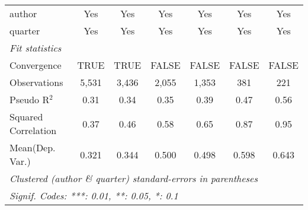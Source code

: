 \begin{tabular}{lcccccc}
   author                                                     & Yes           & Yes           & Yes           & Yes           & Yes           & Yes\\  
   quarter                                                    & Yes           & Yes           & Yes           & Yes           & Yes           & Yes\\  
   \midrule
   \emph{Fit statistics}\\
   Convergence                                                &TRUE           & TRUE          & FALSE         & FALSE         & FALSE         & FALSE\\  
   Observations                                               & 5,531         & 3,436         & 2,055         & 1,353         & 381           & 221\\  
   Pseudo R$^2$                                               & 0.31          & 0.34          & 0.35          & 0.39          & 0.47          & 0.56\\  
   Squared Correlation                                        & 0.37          & 0.46          & 0.58          & 0.65          & 0.87          & 0.95\\  
Mean(Dep. Var.) & 0.321 & 0.344 & 0.500 & 0.498 & 0.598 & 0.643 \\
   \midrule \midrule
   \multicolumn{7}{l}{\emph{Clustered (author \& quarter) standard-errors in parentheses}}\\
   \multicolumn{7}{l}{\emph{Signif. Codes: ***: 0.01, **: 0.05, *: 0.1}}\\
\end{tabular}
\par\endgroup
